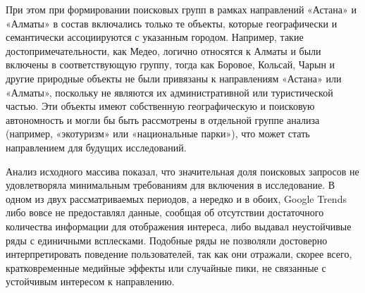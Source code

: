 
При этом при формировании поисковых групп в рамках направлений «Астана»
и «Алматы» в состав включались только те объекты, которые географически
и семантически ассоциируются с указанным городом. Например, такие
достопримечательности, как Медео, логично относятся к Алматы и были
включены в соответствующую группу, тогда как Боровое, Кольсай, Чарын и
другие природные объекты не были привязаны к направлениям «Астана» или
«Алматы», поскольку не являются их административной или туристической
частью. Эти объекты имеют собственную географическую и поисковую
автономность и могли бы быть рассмотрены в отдельной группе анализа
(например, «экотуризм» или «национальные парки»), что может стать
направлением для будущих исследований.

Анализ исходного массива показал, что значительная доля поисковых
запросов не удовлетворяла минимальным требованиям для включения в
исследование. В одном из двух рассматриваемых периодов, а нередко и в
обоих, Google Trends либо вовсе не предоставлял данные, сообщая об
отсутствии достаточного количества информации для отображения интереса,
либо выдавал неустойчивые ряды с единичными всплесками. Подобные ряды не
позволяли достоверно интерпретировать поведение пользователей, так как
они отражали, скорее всего, кратковременные медийные эффекты или
случайные пики, не связанные с устойчивым интересом к направлению.

